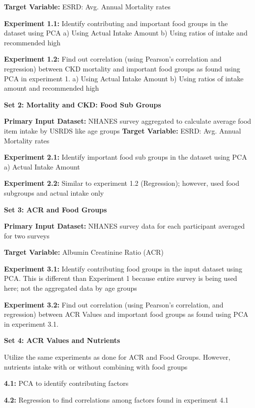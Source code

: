 \noindent \textbf{Target Variable:} ESRD: Avg. Annual Mortality rates

\noindent \textbf{Experiment 1.1:}  Identify contributing and important food groups in the dataset using PCA  a) Using Actual Intake Amount b) Using ratios of intake and recommended high

\noindent \textbf{Experiment 1.2:}  Find out correlation (using Pearson’s correlation and regression) between CKD mortality and important food groups as found using PCA in experiment 1.  a) Using Actual Intake Amount b) Using ratios of intake amount and recommended high


\noindent \textbf{Set 2: Mortality and CKD: Food Sub Groups}

\noindent \textbf{Primary Input Dataset:} NHANES survey aggregated to calculate average food item intake by USRDS like age groups
\noindent \textbf{Target Variable:} ESRD: Avg. Annual Mortality rates

\noindent \textbf{Experiment 2.1:}  Identify important food sub groups in the dataset using PCA a) Actual Intake Amount 

\noindent \textbf{Experiment 2.2:}  Similar to experiment 1.2 (Regression); however, used food subgroups and actual intake only


\noindent \textbf{Set 3: ACR and Food Groups}

\noindent \textbf{Primary Input Dataset:} NHANES survey data for each participant averaged for  two surveys

\noindent \textbf{Target Variable:} Albumin Creatinine Ratio (ACR)

\noindent \textbf{Experiment 3.1:}  Identify contributing food groups in the input dataset using PCA. This is different than Experiment 1 because entire survey is being used here; not the aggregated data by age groups

\noindent \textbf{Experiment 3.2:}  Find out correlation (using Pearson’s correlation, and regression) between ACR Values and important food groups as found using PCA in experiment 3.1.  

\noindent \textbf{Set 4: ACR Values and Nutrients}

\noindent Utilize the same experiments as done for ACR and Food Groups. However, nutrients intake with or without combining with food groups

\noindent \textbf{4.1:} PCA to identify contributing factors

\noindent \textbf{4.2:} Regression to find correlations among factors found in experiment 4.1


